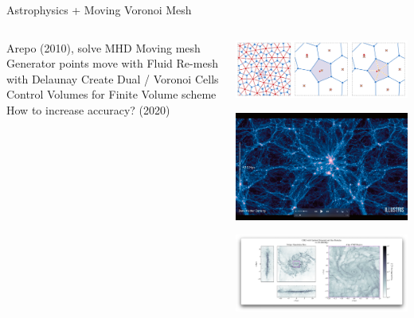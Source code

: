 \placelogofalse
\begin{frame}{Astrophysics + Moving Voronoi Mesh}
  \begin{columns}
  \begin{outline}
    \1 Arepo  \cite{Springel2010Pur} (2010), solve MHD
    \2 Moving mesh 
    \2 Generator points move with Fluid
    \2 Re-mesh with Delaunay 
    \2 Create Dual / Voronoi Cells 
    \2 Control Volumes for Finite Volume scheme
    \1 How to increase accuracy? \cite{Gaburro2020High}(2020)
  \end{outline}


  \begin{center}
    \includegraphics[width=0.9\linewidth]{voronoi.png}

    \vspace{0.2cm}


    \includegraphics[width=0.6\linewidth]{illustris.png}

    \vspace{0.2cm}

    \includegraphics[width=0.9\linewidth]{cmz.png}
  \end{center}
  \end{columns}
\end{frame}
\placelogotrue
